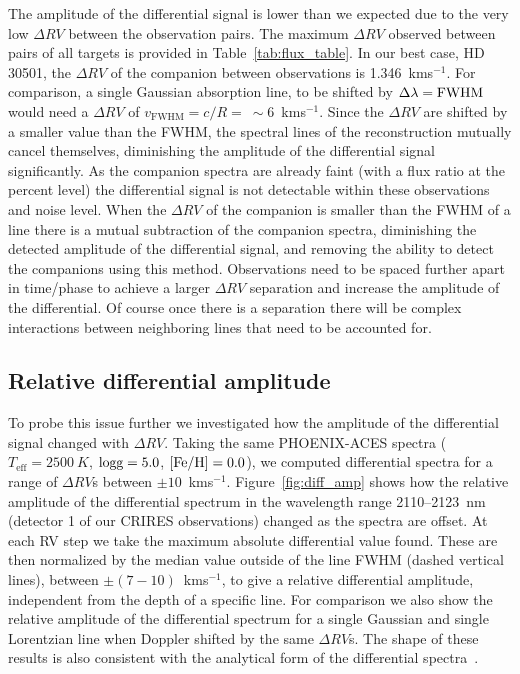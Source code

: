 \documentclass[fleqn,usenatbib]{mnras}
\begin{document}
    The amplitude of the differential signal is lower than we expected due to the very low \(\Delta RV\) between the observation pairs. The maximum \(\Delta RV\) observed between pairs of all targets is provided in Table~\ref{tab:flux_table}.
    In our best case, {HD 30501}, the \(\Delta RV\) of the companion between observations is 1.346~kms\(^{-1}\). For comparison, a single Gaussian absorption line, to be shifted by \(\Delta\lambda = \rm FWHM\) would need a \(\Delta RV\) of \(v_{\textrm{FWHM}} = c/R =~\sim6\)~kms\(^{-1}\). Since the \(\Delta RV\) are shifted by a smaller value than the FWHM, the spectral lines of the reconstruction mutually cancel themselves, diminishing the amplitude of the differential signal significantly. As the companion spectra are already faint (with a flux ratio at the percent level) the differential signal is not detectable within these observations and noise level.
    When the \(\Delta RV \) of the companion is smaller than the FWHM of a line there is a mutual subtraction of the companion spectra, diminishing the detected amplitude of the differential signal, and removing the ability to detect the companions using this method. Observations need to be spaced further apart in time/phase to achieve a larger \(\Delta RV\) separation and increase the amplitude of the differential. Of course once there is a separation there will be complex interactions between neighboring lines that need to be accounted for.
    
    \subsection{Relative differential amplitude}
    To probe this issue further we investigated how the amplitude of the differential signal changed with \(\Delta RV \). Taking the same PHOENIX-ACES spectra (\(T_{\textrm{eff}} = 2500~K \), \(\rm logg=5.0 \), \(\rm [Fe/H]=0.0 \)), we computed differential spectra for a range of \(\Delta RV\)s between \(\pm10\)~kms\(^{-1}\). Figure~\ref{fig:diff_amp} shows how the relative amplitude of the differential spectrum in the wavelength range 2110--2123~nm (detector 1 of our CRIRES observations) changed as the spectra are offset. At each RV step we take the maximum absolute differential value found. These are then normalized by the median value outside of the line FWHM (dashed vertical lines), between \(\pm(7-10)\)~kms\(^{-1}\), to give a relative differential amplitude, independent from the depth of a specific line. For comparison we also show the relative amplitude of the differential spectrum for a single Gaussian and single Lorentzian line when Doppler shifted by the same \(\Delta RV \)s. The shape of these results is also consistent with the analytical form of the differential spectra~\citet[][eqn.~A.1]{ferluga_separating_1997}.
    
\end{document}
